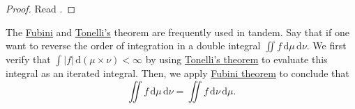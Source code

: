 \begin{proof}
	Read \cite{folland1999real}.
\end{proof}
\begin{remark}
	The \hyperref[thm:Fubini-theorem]{Fubini} and \hyperref[thm:Tonelli-theorem]{Tonelli's} theorem are frequently used in tandem. Say that if one want to reverse the order of integration in a double integral
	\(\iint f \,\mathrm{d} \mu \,\mathrm{d} \nu \). We first verify that \(\int \left\vert f \right\vert \,\mathrm{d} (\mu \times \nu ) < \infty \) by using
	\hyperref[thm:Tonelli-theorem]{Tonelli's theorem} to evaluate this integral as an iterated integral. Then, we apply \hyperref[thm:Fubini-theorem]{Fubini theorem}
	to conclude that
	\[
		\iint f \,\mathrm{d} \mu \,\mathrm{d} \nu = \iint f \,\mathrm{d} \nu \,\mathrm{d} \mu.
	\]
\end{remark}
